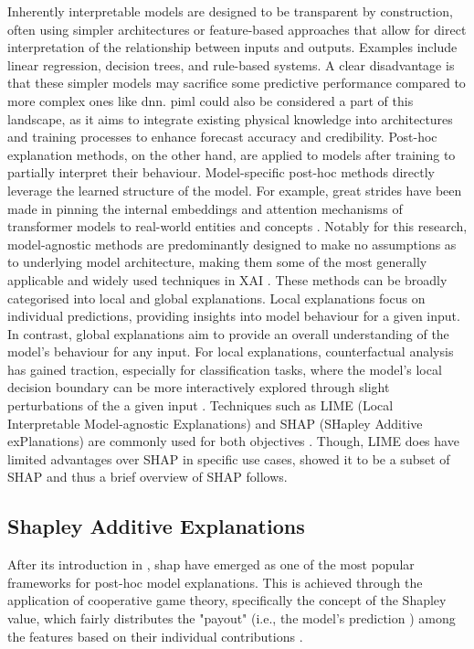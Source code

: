 Inherently interpretable models are designed to be transparent by construction, often using simpler architectures or feature-based approaches that allow for direct interpretation of the relationship between inputs and outputs. Examples include linear regression, decision trees, and rule-based systems. A clear disadvantage is that these simpler models may sacrifice some predictive performance compared to more complex ones like \acrfull{dnn}. \acrshort{piml} could also be considered a part of this landscape, as it aims to integrate existing physical knowledge into architectures and training processes to enhance forecast accuracy and credibility. Post-hoc explanation methods, on the other hand, are applied to models after training to partially interpret their behaviour. Model-specific post-hoc methods directly leverage the learned structure of the model. For example, great strides have been made in pinning the internal embeddings and attention mechanisms of transformer models to real-world entities and concepts . Notably for this research, model-agnostic methods are predominantly designed to make no assumptions as to underlying model architecture, making them some of the most generally applicable and widely used techniques in XAI . These methods can be broadly categorised into local and global explanations. Local explanations focus on individual predictions, providing insights into model behaviour for a given input. In contrast, global explanations aim to provide an overall understanding of the model's behaviour for any input. For local explanations, counterfactual analysis has gained traction, especially for classification tasks, where the model's local decision boundary can be more interactively explored through slight perturbations of the a given input \citep{Mothilal2019}. Techniques such as LIME (Local Interpretable Model-agnostic Explanations) and SHAP (SHapley Additive exPlanations) are commonly used for both objectives \citep{Lundberg2017}. Though, LIME does have limited advantages over SHAP in specific use cases, \cite{Lundberg2017} showed it to be a subset of SHAP and thus a brief overview of SHAP follows.

\subsection{Shapley Additive Explanations}

After its introduction in \cite{Lundberg2017}, \acrfull{shap} have emerged as one of the most popular frameworks for post-hoc model explanations. This is achieved through the application of cooperative game theory, specifically the concept of the Shapley value, which fairly distributes the "payout" (i.e., the model's prediction ) among the features based on their individual contributions .

